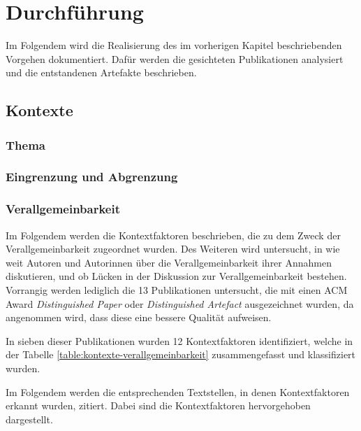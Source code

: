 \chapter{Durchführung}
\label{chapter:impl}
Im Folgendem wird die Realisierung des im vorherigen Kapitel beschriebenden Vorgehen dokumentiert. Dafür werden die gesichteten Publikationen analysiert und die entstandenen Artefakte beschrieben.

\section{Kontexte}

\subsection{Thema}

\subsection{Eingrenzung und Abgrenzung}

\clearpage
\subsection{Verallgemeinbarkeit}

Im Folgendem werden die Kontextfaktoren beschrieben,
die zu dem Zweck der Verallgemeinbarkeit zugeordnet wurden.
Des Weiteren wird untersucht, in wie weit Autoren und Autorinnen über die Verallgemeinbarkeit ihrer Annahmen diskutieren,
und ob Lücken in der Diskussion zur Verallgemeinbarkeit bestehen. \\

Vorrangig werden lediglich die 13 Publikationen untersucht,
die mit einen ACM Award \textit{Distinguished Paper} oder \textit{Distinguished Artefact} ausgezeichnet wurden,
da angenommen wird, dass diese eine bessere Qualität aufweisen.

In sieben dieser Publikationen wurden 12 Kontextfaktoren identifiziert,
welche in der Tabelle \ref{table:kontexte-verallgemeinbarkeit} zusammengefasst und klassifiziert wurden.

Im Folgendem werden die entsprechenden Textstellen, in denen Kontextfaktoren erkannt wurden, zitiert.
Dabei sind die Kontextfaktoren hervorgehoben dargestellt. \\


